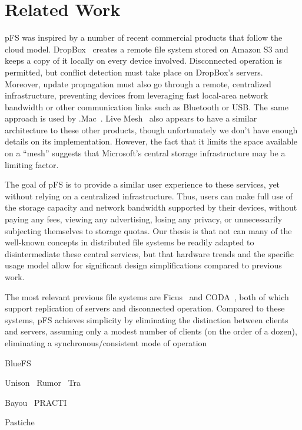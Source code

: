 
\section{Related Work}
\label{s:related}


pFS was inspired by a number of recent commercial products that follow
the cloud model.  DropBox~\cite{houston:dropbox} creates a remote file
system stored on Amazon S3 and keeps a copy of it locally on every
device involved.  Disconnected operation is permitted, but conflict
detection must take place on DropBox's servers.  Moreover, update
propagation must also go through a remote, centralized infrastructure,
preventing devices from leveraging fast local-area network bandwidth
or other communication links such as Bluetooth or USB\@.  The same
approach is used by .Mac~\cite{apple:mac}.  Live
Mesh~\cite{microsoft:livemesh} also appears to have a similar
architecture to these other products, though unfortunately we don't
have enough details on its implementation.  However, the fact that it
limits the space available on a ``mesh'' suggests that Microsoft's
central storage infrastructure may be a limiting factor.

The goal of pFS is to provide a similar user experience to these
services, yet without relying on a centralized infrastructure.  Thus,
users can make full use of the storage capacity and network bandwidth
supported by their devices, without paying any fees, viewing any
advertising, losing any privacy, or unnecessarily subjecting
themselves to storage quotas.  Our thesis is that not can many of the
well-known concepts in distributed file systems be readily adapted to
disintermediate these central services, but that hardware trends and
the specific usage model allow for significant design simplifications
compared to previous work.

The most relevant previous file systems are Ficus~\cite{page:ficus}
and CODA~\cite{kistler:coda}, both of which support replication of
servers and disconnected operation.  Compared to these systems, pFS
achieves simplicity by eliminating the distinction between clients and
servers, assuming only a modest number of clients (on the order of a
dozen), eliminating a synchronous/consistent mode of operation

BlueFS~\cite{peek:bluefs}



Unison~\cite{balasubramanian:unison}
Rumor~\cite{guy:rumor}
Tra~\cite{cox:tra}

Bayou~\cite{petersen:flexible-update}
PRACTI~\cite{belaramani:pract}

Pastiche~\cite{cox:pastiche,nguyen:friendstore}


